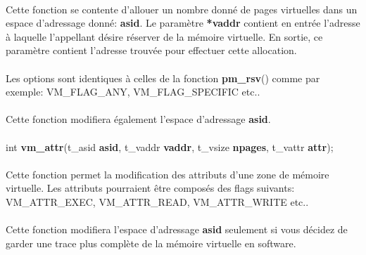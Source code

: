 \documentclass[10pt,a4wide]{article}
\begin{document}
\paragraph{}

Cette fonction se contente d'allouer un nombre donn\'e de pages virtuelles
dans un espace d'adressage donn\'e: \textbf{asid}. Le param\`etre
\textbf{*vaddr} contient en entr\'ee l'adresse \`a laquelle l'appellant
d\'esire r\'eserver de la m\'emoire virtuelle. En sortie, ce param\`etre
contient l'adresse trouv\'ee pour effectuer cette allocation.

\paragraph{}

Les options sont identiques \`a celles de la fonction \textbf{pm\_rsv}()
comme par exemple: VM\_FLAG\_ANY, VM\_FLAG\_SPECIFIC etc..

\paragraph{}

Cette fonction modifiera \'egalement l'espace d'adressage \textbf{asid}.

\paragraph{}

\hspace{1.5cm}int \textbf{vm\_attr}(t\_asid \textbf{asid},
                                    t\_vaddr \textbf{vaddr},
                                    t\_vsize \textbf{npages},
                                    t\_vattr \textbf{attr});

\paragraph{}

Cette fonction permet la modification des attributs d'une zone de
m\'emoire virtuelle. Les attributs pourraient \^etre compos\'es
des flags suivants: VM\_ATTR\_EXEC, VM\_ATTR\_READ, VM\_ATTR\_WRITE etc..

\paragraph{}

Cette fonction modifiera l'espace d'adressage \textbf{asid} seulement si
vous d\'ecidez de garder une trace plus compl\`ete de la m\'emoire virtuelle
en software.
\end{document}

